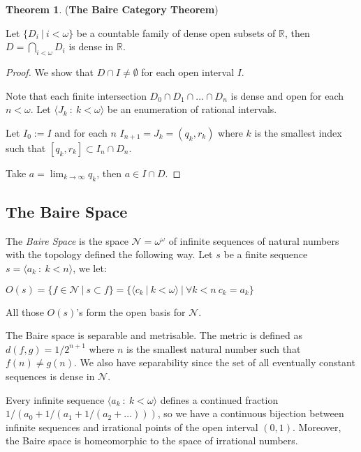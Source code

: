 \documentclass[8pt]{article}
\theoremstyle{definition}
\theoremstyle{definition}
\newtheorem{theorem}{Theorem}[section]
\theoremstyle{definition}
\theoremstyle{definition}
\theoremstyle{definition}
\theoremstyle{definition}
\theoremstyle{definition}
\theoremstyle{definition}
\theoremstyle{definition}
\theoremstyle{definition}
\theoremstyle{definition}
\theoremstyle{definition}
\theoremstyle{definition}
\theoremstyle{definition}
\theoremstyle{question}
\begin{document}
\begin{theorem} ({\bf The Baire Category Theorem})

  Let $\{ D_i \: | \: i < \omega \}$ be a countable family of dense open subsets of $\mathbb{R}$, then
  $D = \bigcap \limits_{i < \omega} D_i$ is dense in $\mathbb{R}$.
\end{theorem}

\begin{proof}
  We show that $D \cap I \neq \emptyset$ for each open interval $I$.

  Note that each finite intersection $D_0 \cap D_1 \cap \dots \cap D_n$ is dense and open for each $n < \omega$.
  Let $\langle J_k \: : \: k < \omega \rangle$ be an enumeration of rational intervals.
  
  Let $I_0 := I$ and for each $n$ $I_{n + 1} = J_k = (q_k, r_k)$ 
  where $k$ is the smallest index such that $[q_k, r_k] \subset I_n \cap D_n$.

  Take $a = \lim_{k \to \infty} q_k$, then $a \in I \cap D$.
\end{proof}

\subsection{The Baire Space}

The \emph{Baire Space} is the space $\mathcal{N} = \omega^{\omega}$ of infinite sequences of natural numbers
with the topology defined the following way.
Let $s$ be a finite sequence $s = \langle a_k \: : \: k < n \rangle$, we let:
\begin{center}
  $O(s) = \{ f \in \mathcal{N} \: | \: s \subset f \} = \{ \langle c_k \: | \: k < \omega \rangle \: | \: \forall k < n \: c_k = a_k \}$
\end{center}
All those $O(s)$'s form the open basis for $\mathcal{N}$.

The Baire space is separable and metrisable. The metric is defined as $d(f, g) = 1/2^{n + 1}$ 
where $n$ is the smallest natural number such that $f(n) \neq g(n)$. 
We also have separability since the set of all eventually constant sequences is dense in $\mathcal{N}$.

Every infinite sequence $\langle a_k \: : \: k < \omega \rangle$ defines a continued fraction $1/(a_0 + 1/(a_1 + 1/(a_2 + \dots)))$,
so we have a continuous bijection between infinite sequences and irrational points of the open interval $(0, 1)$. 
Moreover, the Baire space is homeomorphic to the space of irrational numbers.
\end{document}
